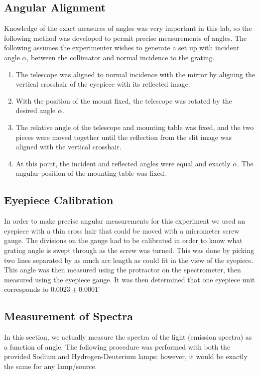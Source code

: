 \documentclass[paper=a4, fontsize=11pt]{scrartcl} %
\numberwithin{equation}{section}
\numberwithin{figure}{section}
\numberwithin{table}{section}
\begin{document}
\subsection{Angular Alignment}
\label{sec:angal}
Knowledge of the exact measures of angles was very important in this
lab, so the following method was developed to permit precise
measurements of angles. The following assumes the experimenter wishes
to generate a set up with incident angle $\alpha$, between the
collimator and normal incidence to the grating.

\begin{enumerate}
\item The telescope was aligned to normal incidence with the mirror by
  aligning the vertical crosshair of the eyepiece with its reflected image. 
\item With the position of the mount fixed, the telescope was rotated
  by the desired angle $\alpha$.
\item The relative angle of the telescope and mounting table was
  fixed, and the two pieces were moved together until the reflection
  from the slit image was aligned with the vertical crosshair. 
\item At this point, the incident and reflected angles were equal and exactly $\alpha$. The angular position of the mounting table was fixed.
\end{enumerate}

\subsection{Eyepiece Calibration}
\label{sec:eyecal}

In order to make precise angular measurements for this experiment we
used an eyepiece with a thin cross hair that could be moved with a
micrometer screw gauge. The divisions on the gauge had to be
calibrated in order to know what grating angle is swept through as the
screw was turned. This was done by picking two lines separated by as
much arc length as could fit in the view of the eyepiece. This angle
was then measured using the protractor on the spectrometer, then
measured using the eyepiece gauge. It was then determined that one
eyepiece unit corresponds to $0.0023\pm0.0001^{\circ}$

\subsection{Measurement of Spectra}
\label{sec:specmes}
In this section, we actually measure the spectra of the light (emission spectra) as a function of angle. The following procedure was performed with both the provided Sodium and Hydrogen-Deuterium lamps; however, it would be exactly the same for any lamp/source.
\end{document}
